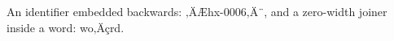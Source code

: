 \begin{lemma}\label{hx-0006}
An identifier embedded backwards: ‚ÄÆhx-0006‚Ä¨, and a zero-width joiner inside a word: wo‚Äçrd.
\end{lemma}